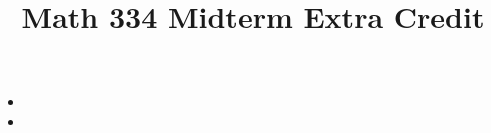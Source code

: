 \documentclass{article}
\title{Math 334 Midterm Extra Credit}
\begin{document}
\maketitle
\begin{itemize}[label=]
	\item 
	\item 
\end{itemize}
\end{document}
